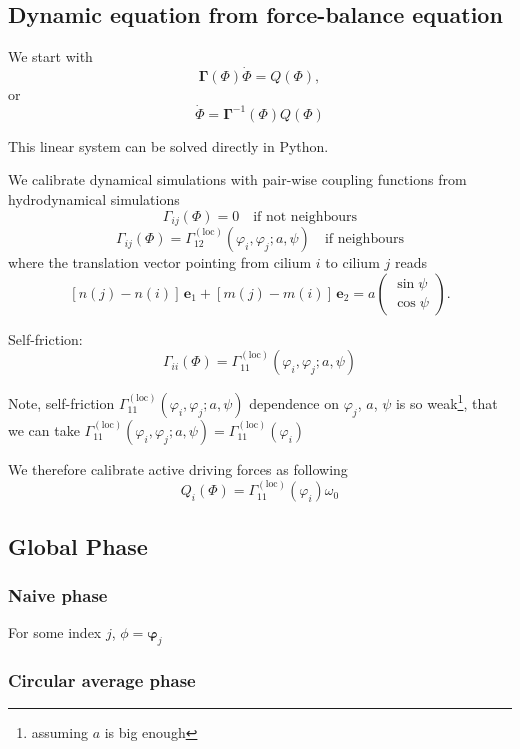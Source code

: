 \documentclass[a4paper,12pt]{article}
\begin{document}
\subsection{Dynamic equation from force-balance equation}

We start with
$$  \mathbf{\Gamma}(\Phi) \dot{\Phi} =Q(\Phi),$$
or
\begin{equation}
\dot{\Phi} = \mathbf{\Gamma}^{-1}(\Phi)Q(\Phi) 
\label{eqn:phi_gamma}
\end{equation}


This linear system can be solved directly in Python.

We calibrate dynamical simulations with pair-wise coupling functions from hydrodynamical simulations
$$ \Gamma_{ij}(\Phi) = 0 \quad \text{if not neighbours} $$
$$ \Gamma_{ij}(\Phi) = \Gamma_{12}^{\mathrm{(loc)}}(\varphi_i,\varphi_j; a, \psi) \quad \text{if neighbours} $$
where the translation vector pointing from cilium $i$ to cilium $j$ reads
$$[n(j)-n(i)]\,\mathbf{e}_1 + [m(j)-m(i)]\,\mathbf{e}_2 = a \left( \begin{array}{c} \sin\psi \\ \cos\psi \end{array} \right).$$

Self-friction:
$$ \Gamma_{ii}(\Phi) = \Gamma_{11}^{\mathrm{(loc)}}(\varphi_i, \varphi_j; a, \psi) $$

Note, self-friction $\Gamma_{11}^{\mathrm{(loc)}}(\varphi_i, \varphi_j; a, \psi) $ dependence on $\varphi_j$, $a$, $\psi$ is so weak\footnote{assuming $a$ is big enough}, that we can take
$\Gamma_{11}^{\mathrm{(loc)}}(\varphi_i, \varphi_j; a, \psi)= \Gamma_{11}^{\mathrm{(loc)}}(\varphi_i)$

We therefore calibrate active driving forces as following
$$ Q_{i}(\Phi) = \Gamma_{11}^{\mathrm{(loc)}}(\varphi_i) \omega_0 $$


\subsection{Global Phase}

\subsubsection{Naive phase}
For some index $j$, $\phi = \mathbf{\varphi}_j$

\subsubsection{Circular average phase}
\end{document}
